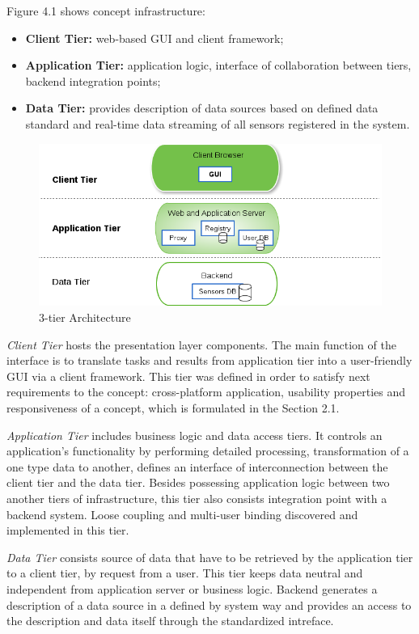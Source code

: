   Figure 4.1 shows concept infrastructure:
  \begin{itemize}
  \item \textbf{Client Tier:} web-based GUI and client framework;
  \item \textbf{Application Tier:} application logic, interface of collaboration between tiers, backend integration points;
  \item \textbf{Data Tier:} provides description of data sources based on defined data standard and real-time data streaming of all sensors registered in the system.
  \end{itemize} 
  \begin{figure}[!ht]
  \centering
  \includegraphics[scale=0.7]{images/3tier.png}   
  \caption[3-tier Architecture]{3-tier Architecture}
  \label{img:3-tier Architecture}                           
  \end{figure}

  \emph{Client Tier} hosts the presentation layer components. The main function of the interface is to translate tasks and results from application tier into a user-friendly GUI via a client framework. This tier was defined in order to satisfy next requirements to the concept: cross-platform application, usability properties and responsiveness of a concept, which is formulated in the Section 2.1.

  \emph{Application Tier} includes business logic and data access tiers. It controls an application's functionality by performing detailed processing, transformation of a one type data to another, defines an interface of interconnection between the client tier and the data tier. Besides possessing application logic between two another tiers of infrastructure, this tier also consists integration point with a backend system. Loose coupling and multi-user binding discovered and implemented in this tier.

  \emph{Data Tier} consists source of data that have to be retrieved by the application tier to a client tier, by request from a user. This tier keeps data neutral and independent from application server or business logic. Backend generates a description of a data source in a defined by system way and provides an access to the description and data itself through the standardized intreface.

